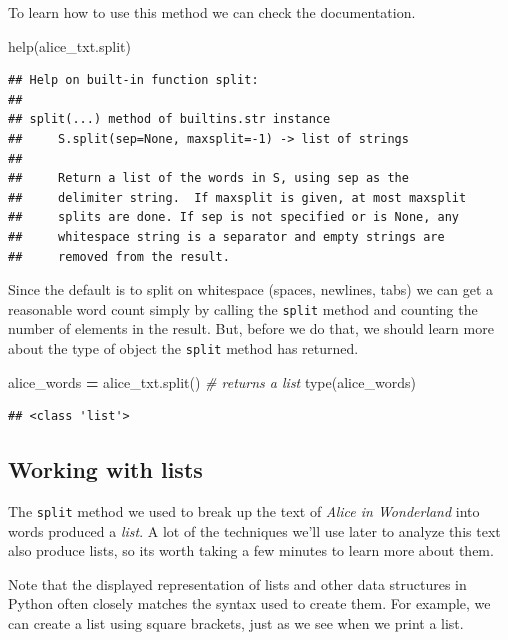 \documentclass[
]{book}
\newenvironment{Shaded}{\begin{snugshade}}{\end{snugshade}}
\newcommand{\BuiltInTok}[1]{#1}
\newcommand{\CommentTok}[1]{\textcolor[rgb]{0.56,0.35,0.01}{\textit{#1}}}
\newcommand{\NormalTok}[1]{#1}
\newcommand{\OperatorTok}[1]{\textcolor[rgb]{0.81,0.36,0.00}{\textbf{#1}}}
\begin{document}
To learn how to use this method we can check the documentation.

\begin{Shaded}
\begin{Highlighting}[]
\BuiltInTok{help}\NormalTok{(alice\_txt.split)}
\end{Highlighting}
\end{Shaded}

\begin{verbatim}
## Help on built-in function split:
## 
## split(...) method of builtins.str instance
##     S.split(sep=None, maxsplit=-1) -> list of strings
##     
##     Return a list of the words in S, using sep as the
##     delimiter string.  If maxsplit is given, at most maxsplit
##     splits are done. If sep is not specified or is None, any
##     whitespace string is a separator and empty strings are
##     removed from the result.
\end{verbatim}

Since the default is to split on whitespace (spaces, newlines, tabs) we can get a reasonable word count simply by calling the \texttt{split} method and counting the number of elements in the result. But, before we do that, we should learn more about the type of object the \texttt{split} method has returned.

\begin{Shaded}
\begin{Highlighting}[]
\NormalTok{alice\_words }\OperatorTok{=}\NormalTok{ alice\_txt.split() }\CommentTok{\# returns a list}
\BuiltInTok{type}\NormalTok{(alice\_words)}
\end{Highlighting}
\end{Shaded}

\begin{verbatim}
## <class 'list'>
\end{verbatim}

\hypertarget{working-with-lists}{%
\subsection{Working with lists}\label{working-with-lists}}

The \texttt{split} method we used to break up the text of \emph{Alice in Wonderland} into words produced a \emph{list}. A lot of the techniques we'll use later to analyze this text also produce lists, so its worth taking a few minutes to learn more about them.

Note that the displayed representation of lists and other data structures in Python often closely matches the syntax used to create them. For example, we can create a list using square brackets, just as we see when we print a list.
\end{document}
